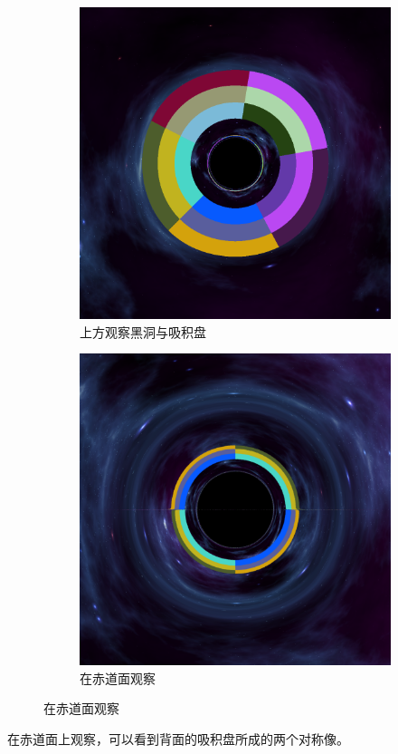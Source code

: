 \begin{figure}[H]
    \centering
    \begin{subfigure}{.5\textwidth}
        \centering
        \includegraphics[width=.8\linewidth]{images/disk_top.png}
        \caption{上方观察黑洞与吸积盘}
        \label{fig:disk_top}
    \end{subfigure}%
    \begin{subfigure}{.5\textwidth}
        \centering
        \includegraphics[width=.8\linewidth]{images/equatorial_plane.png}
        \caption{在赤道面观察}
        \label{fig:einstein-ring}
    \end{subfigure}
\end{figure}
在赤道面上观察，可以看到背面的吸积盘所成的两个对称像。

